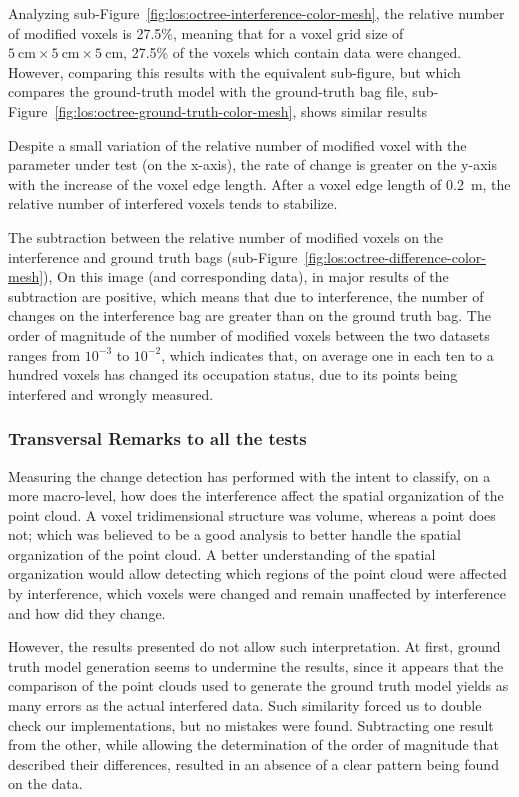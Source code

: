 Analyzing sub-Figure~\ref{fig:los:octree-interference-color-mesh}, the relative number of modified voxels is 27.5\%, meaning that for a voxel grid size of $\SI{5}{\centi\meter}\times \SI{5}{\centi\meter}\times \SI{5}{\centi\meter}$, 27.5\% of the voxels which contain data were changed. However, comparing this results with the equivalent sub-figure, but which compares the ground-truth model with the ground-truth bag file, sub-Figure~\ref{fig:los:octree-ground-truth-color-mesh}, shows similar results

Despite a small variation of the relative number of modified voxel with the parameter under test (on the x-axis), the rate of change is greater on the y-axis with the increase of the voxel edge length. After a voxel edge length of \SI{0.2}{\meter}, the relative number of interfered voxels tends to stabilize. 

The subtraction between the relative number of modified voxels on the interference and ground truth bags (sub-Figure~\ref{fig:los:octree-difference-color-mesh}), On this image (and corresponding data), in major results of the subtraction are positive, which means that due to interference, the number of changes on the interference bag are greater than on the ground truth bag. The order of magnitude of the number of modified voxels between the two datasets ranges from $10^{-3}$ to $10^{-2}$, which indicates that, on average one in each ten to a hundred voxels has changed its occupation status, due to its points being interfered and wrongly measured.


\subsubsection{Transversal Remarks to all the tests}
Measuring the change detection has performed with the intent to classify, on a more macro-level, how does the interference affect the spatial organization of the point cloud. A voxel tridimensional structure was volume, whereas a point does not; which was believed to be a good analysis to better handle the spatial organization of the point cloud. A better understanding of the spatial organization would allow detecting which regions of the point cloud were affected by interference, which voxels were changed and remain unaffected by interference and how did they change.

However, the results presented do not allow such interpretation. At first, ground truth model generation seems to undermine the results, since it appears that the comparison of the point clouds used to generate the ground truth model yields as many errors as the actual interfered data. Such similarity forced us to double check our implementations, but no mistakes were found. Subtracting one result from the other, while allowing the determination of the order of magnitude that described their differences, resulted in an absence of a clear pattern being found on the data.

